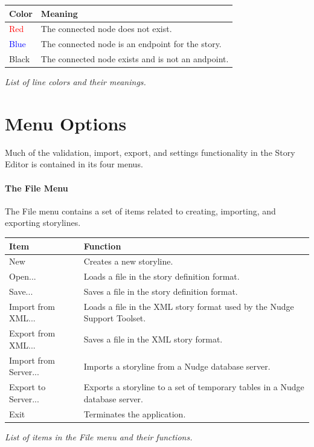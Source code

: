 \documentclass[12pt,letterpaper]{article}
\begin{document}
\begin{center}
    \begin{tabular}{l|p{4in}}
    Color & Meaning\\ \hline \hline
    \textcolor{red}{Red} & The connected node does not exist.\\ \hline
    \textcolor{blue}{Blue} & The connected node is an endpoint for the story.\\ \hline
    Black & The connected node exists and is not an andpoint.\\ \hline
    \end{tabular}
    
    
    \textit{List of line colors and their meanings.}
\end{center}

\section{Menu Options}
Much of the validation, import, export, and settings functionality in the Story Editor is contained in its four menus.

\paragraph{The File Menu}
The File menu contains a set of items related to creating, importing, and exporting storylines.

\begin{center}
    \begin{tabular}{l|p{4in}}
    Item & Function\\ \hline \hline
    New & Creates a new storyline.\\ \hline
    Open... & Loads a file in the story definition format.\\ \hline
    Save... & Saves a file in the story definition format.\\ \hline
    Import from XML... & Loads a file in the XML story format used by the Nudge Support Toolset.\\ \hline
    Export from XML... & Saves a file in the XML story format.\\ \hline
    Import from Server... & Imports a storyline from a Nudge database server.\\ \hline
    Export to Server... & Exports a storyline to a set of temporary tables in a Nudge database server.\\ \hline
    Exit & Terminates the application.\\ \hline
    \end{tabular}
    \textit{List of items in the File menu and their functions.}
\end{center}
\end{document}
